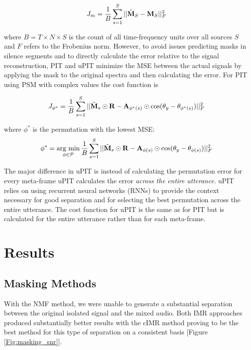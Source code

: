 \documentclass[journal, a4paper]{IEEEtran}
\DeclareMathOperator*{\argmin}{arg\ min}
\begin{document}
\begin{equation}
J_m = \dfrac{1}{B} \sum_{s=1}^S || \Hat{\mathbf{M}}_S - \mathbf{M}_S ||^2_F
\end{equation}

where $B = T \times N \times S$ is the count of all time-frequency units over all sources $S$ and $F$ refers to the Frobenius norm. However, to avoid issues predicting masks in silence segments and to directly calculate the error relative to the signal reconstruction, PIT and uPIT minimize the MSE between the actual signals by applying the mask to the original spectra and then calculating the error. For PIT using PSM with complex values the cost function is

\begin{equation}
J_{\phi^*} = \dfrac{1}{B} \sum_{s=1}^S || \Hat{\mathbf{M}}_s \odot \mathbf{R} - 
\mathbf{A}_{\phi^*(s)} \odot \cos(\theta_y - \theta_{\phi^*(s)}) ||^2_F  
\end{equation}

where $\phi^*$ is the permutation with the lowest MSE:
\begin{equation}
\phi^* = \argmin_{\phi \in \mathcal{P}} \dfrac{1}{B} \sum_{s=1}^S || \Hat{\mathbf{M}}_s \odot \mathbf{R} - 
\mathbf{A}_{\phi(s)} \odot \cos(\theta_y - \theta_{\phi(s)}) ||^2_F  
\end{equation}

The major difference in uPIT is instead of calculating the permutation error for every meta-frame uPIT calculates the error \textit{across the entire utterance}. uPIT relies on using recurrent neural networks (RNNs) to provide the context necessary for good separation and for selecting the best permutation across the entire utterance. The cost function for uPIT is the same as for PIT but is calculated for the entire utterance rather than for each meta-frame.

\section{Results}

\subsection{Masking Methods}

With the NMF method, we were unable to generate a substantial separation between the original isolated signal and the mixed audio. Both IMR approaches produced substantially better results with the cIMR method proving to be the best method for this type of separation on a consistent basis [Figure \ref{Fig:masking_snr}].
\end{document}
